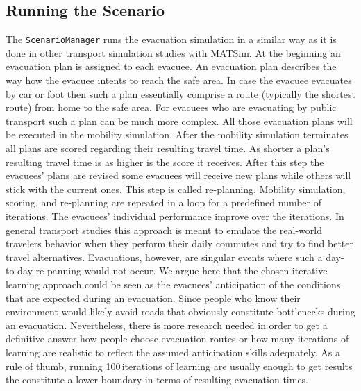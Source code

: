 \subsection{Running the Scenario}
The \lstinline|ScenarioManager| runs the evacuation simulation in a similar way as it is done in other transport simulation studies with MATSim. 
At the beginning an evacuation plan is assigned to each evacuee. 
An evacuation plan describes the way how the evacuee intents to reach the safe area.
In case the evacuee evacuates by car or foot then such a plan essentially comprise a route (typically the shortest route) from home to the safe area. For evacuees who are evacuating by public transport such a plan can be much more complex. All those evacuation plans will be executed in the mobility simulation. After the mobility simulation terminates all plans are scored regarding their resulting travel time. 
As shorter a plan's resulting travel time is as higher is the score it receives. After this step the evacuees' plans are revised some evacuees will receive new plans while others will stick with the current ones. This step is called re-planning. Mobility simulation, scoring, and re-planning are repeated in a loop for a predefined number of iterations. The evacuees' individual performance improve over the iterations. 
In general transport studies this approach is meant to emulate the real-world travelers behavior when they perform their daily commutes and try to find better travel alternatives. Evacuations, however, are singular events where such a day-to-day re-panning would not occur. We argue here that the chosen iterative learning approach could be seen as the evacuees' anticipation of the conditions that are expected during an evacuation. 
Since people who know their  environment would likely avoid roads that obviously constitute bottlenecks during an evacuation. Nevertheless, there is more research needed in order to get a definitive answer how people choose evacuation routes or how many iterations of learning are realistic to reflect the assumed anticipation skills adequately. As a rule of thumb, running 100\,iterations of learning are usually enough to get results the constitute a lower boundary in terms of resulting evacuation times.

